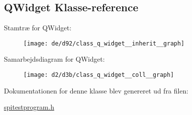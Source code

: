 \hypertarget{class_q_widget}{}\subsection{Q\+Widget Klasse-\/reference}
\label{class_q_widget}


Stamtræ for Q\+Widget\+:\nopagebreak
\begin{figure}[H]
\begin{center}
\leavevmode
\texttt{[image: de/d92/class\_q\_widget\_\_inherit\_\_graph]}
\end{center}
\end{figure}


Samarbejdsdiagram for Q\+Widget\+:\nopagebreak
\begin{figure}[H]
\begin{center}
\leavevmode
\texttt{[image: d2/d3b/class\_q\_widget\_\_coll\_\_graph]}
\end{center}
\end{figure}


Dokumentationen for denne klasse blev genereret ud fra filen\+:\begin{DoxyCompactItemize}
\item 
\hyperlink{spitestprogram_8h}{spitestprogram.\+h}\end{DoxyCompactItemize}
